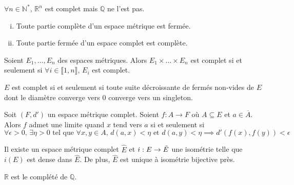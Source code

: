 	\begin{example}
		$\forall n \in \mathbb{N}^*$, $\mathbb{R}^n$ est complet mais $\mathbb{Q}$ ne l'est pas.
	\end{example}
	
	\begin{proposition}
		\begin{enumerate}[(i)]
			\item Toute partie complète d'un espace métrique est fermée.
			\item Toute partie fermée d'un espace complet est complète.
		\end{enumerate}
	\end{proposition}
	
	\begin{proposition}
		Soient $E_1, \dots, E_n$ des espaces métriques. Alors $E_1 \times \dots \times E_n$ est complet si et seulement si $\forall i \in \llbracket 1, n \rrbracket$, $E_i$ est complet.
	\end{proposition}
	
	\begin{proposition}
		$E$ est complet si et seulement si toute suite décroissante de fermés non-vides de $E$ dont le diamètre converge vers $0$ converge vers un singleton.
	\end{proposition}
	
	\begin{proposition}
		Soit $(F, d')$ un espace métrique complet. Soient $f : A \rightarrow F$ où $A \subseteq E$ et $a \in \overline{A}$. Alors $f$ admet une limite quand $x$ tend vers $a$ si et seulement si
		\[ \forall \epsilon > 0, \, \exists \eta > 0 \text{ tel que } \forall x, y \in A, \, d(a,x) < \eta \text{ et } d(a,y) < \eta \implies d'(f(x), f(y)) < \epsilon \]
	\end{proposition}
	
	
	\begin{theorem}
		Il existe un espace métrique complet $\widehat{E}$ et $i : E \rightarrow \Tilde{E}$ une isométrie telle que $i(E)$ est dense dans $\widehat{E}$. De plus, $\widehat{E}$ est unique à isométrie bijective près.
	\end{theorem}
	
	\begin{example}
		$\mathbb{R}$ est le complété de $\mathbb{Q}$.
	\end{example}
	
